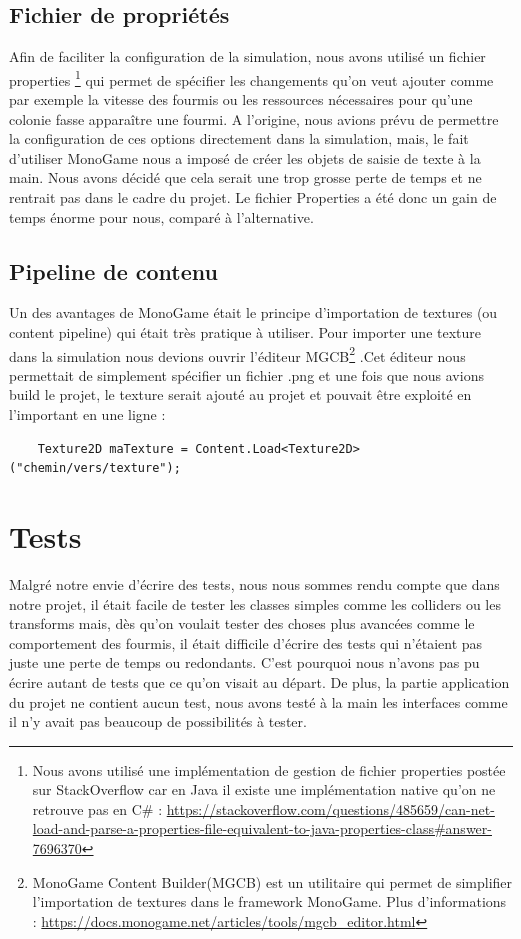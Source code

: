\documentclass{EPUProjetDi}
\begin{document}
\subsection{Fichier de propriétés}
Afin de faciliter la configuration de la simulation, nous avons utilisé un fichier properties
\footnote{Nous avons utilisé une implémentation de gestion de fichier properties postée sur StackOverflow car en Java il existe une implémentation native qu'on ne retrouve pas en C\# : 
\url{https://stackoverflow.com/questions/485659/can-net-load-and-parse-a-properties-file-equivalent-to-java-properties-class\#answer-7696370}}
qui permet de spécifier les changements qu'on veut ajouter comme par exemple la vitesse des fourmis
ou les ressources nécessaires pour qu'une colonie fasse apparaître une fourmi. A l'origine, nous avions prévu de permettre la configuration de ces options directement dans la simulation, mais,
le fait d'utiliser MonoGame nous a imposé de créer les objets de saisie de texte à la main. Nous avons décidé que cela serait une trop grosse perte de temps et ne rentrait pas dans 
le cadre du projet. Le fichier Properties a été donc un gain de temps énorme pour nous, comparé à l'alternative.

\subsection{Pipeline de contenu}
Un des avantages de MonoGame était le principe d'importation de textures (ou content pipeline) qui était très pratique à utiliser. Pour importer une texture dans la simulation nous devions ouvrir l'éditeur 
MGCB\footnote{MonoGame Content Builder(MGCB) est un utilitaire qui permet de simplifier l'importation de textures dans le framework MonoGame. Plus d'informations : \url{https://docs.monogame.net/articles/tools/mgcb_editor.html}}
.Cet éditeur nous permettait de simplement spécifier un fichier .png et une fois que nous avions build le projet, le texture serait ajouté au projet et pouvait être exploité en l'important en une ligne : 
\begin{verbatim}
    Texture2D maTexture = Content.Load<Texture2D>("chemin/vers/texture");
\end{verbatim}

\section{Tests}

Malgré notre envie d'écrire des tests, nous nous sommes rendu compte que dans notre projet, il était facile de tester les classes simples comme les colliders ou les transforms
mais, dès qu'on voulait tester des choses plus avancées comme le comportement des fourmis, il était difficile d'écrire des tests qui n'étaient pas juste une perte de temps ou redondants.
C'est pourquoi nous n'avons pas pu écrire autant de tests que ce qu'on visait au départ. De plus, la partie application du projet ne contient aucun test, nous avons testé à la main les interfaces comme il n'y
avait pas beaucoup de possibilités à tester.
\end{document}
